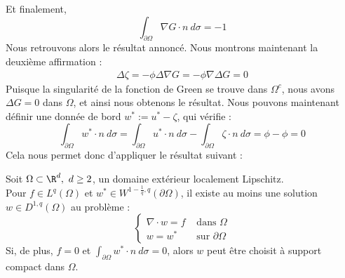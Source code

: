 Et finalement, 
$$ \int_{\partial \Omega} \nabla G \cdot n \ d\sigma = -1 $$
Nous retrouvons alors le résultat annoncé. Nous montrons maintenant la deuxième affirmation :
\begin{align*}
    \Delta \zeta = - \phi \Delta \nabla G = - \phi \nabla \Delta G = 0
\end{align*}
Puisque la singularité de la fonction de Green se trouve dans $\Omega^c$, nous avons $\Delta G = 0$ dans $\Omega$, et ainsi nous obtenons le résultat.
Nous pouvons maintenant définir une donnée de bord $w^* := u^* - \zeta $, qui vérifie :
$$ \int_{\partial \Omega} w^* \cdot n \ d\sigma = \int_{\partial \Omega} u^* \cdot n \ d\sigma - \int_{\partial \Omega} \zeta \cdot n \ d\sigma = \phi - \phi = 0 $$
Cela nous permet donc d'appliquer le résultat suivant \cite{Galdi} :
\begin{lemmabox}
    \begin{lemma}
        Soit $\Omega \subset \R^d, \ d \geq 2$, un domaine extérieur localement Lipschitz.\\
        Pour $f \in L^q(\Omega)$ et $w^* \in W^{1 - \frac{1}{q},q}(\partial \Omega)$, il existe au moins une solution $w \in D^{1,q}(\Omega)$ au problème :
        $$\begin{cases}
            \nabla \cdot w = f &\text{ dans } \Omega \\
            w = w^* &\text{ sur } \partial \Omega
        \end{cases}$$
        Si, de plus, $f = 0$ et $\displaystyle \int_{\partial \Omega} w^* \cdot n \ d\sigma = 0 $, alors $w$ peut être choisit à support compact dans $\Omega$.
    \end{lemma}
\end{lemmabox}

